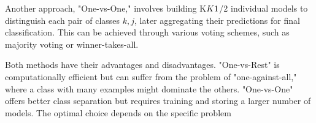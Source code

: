 Another approach, "One-vs-One," involves building K\(K\-1\)/2 individual models to distinguish each pair of classes \(k, j\), later aggregating their predictions for final classification. This can be achieved through various voting schemes, such as majority voting or winner-takes-all.

Both methods have their advantages and disadvantages. "One-vs-Rest" is computationally efficient but can suffer from the problem of "one-against-all," where a class with many examples might dominate the others. "One-vs-One" offers better class separation but requires training and storing a larger number of models. The optimal choice depends on the specific problem
